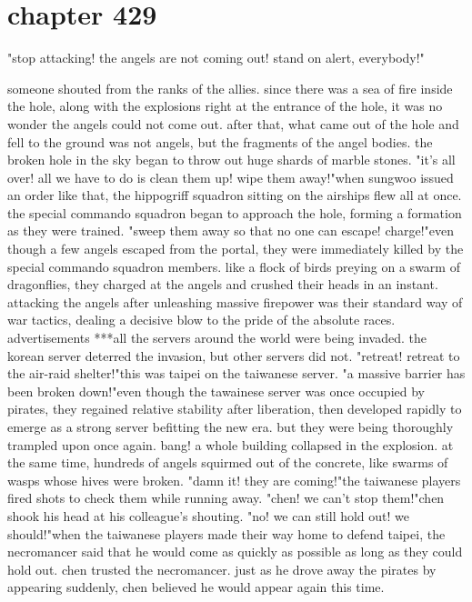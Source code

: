 \section{chapter 429}

"stop attacking! the angels are not coming out! stand on alert, everybody!"




someone shouted from the ranks of the allies.
 since there was a sea of fire inside the hole, along with the explosions right at the entrance of the hole, it was no wonder the angels could not come out.
after that, what came out of the hole and fell to the ground was not angels, but the fragments of the angel bodies.
 the broken hole in the sky began to throw out huge shards of marble stones.
"it's all over! all we have to do is clean them up! wipe them away!"when sungwoo issued an order like that, the hippogriff squadron sitting on the airships flew all at once.
 the special commando squadron began to approach the hole, forming a formation as they were trained.
"sweep them away so that no one can escape! charge!"even though a few angels escaped from the portal, they were immediately killed by the special commando squadron members.
like a flock of birds preying on a swarm of dragonflies, they charged at the angels and crushed their heads in an instant.
attacking the angels after unleashing massive firepower was their standard way of war tactics, dealing a decisive blow to the pride of the absolute races.
advertisements    ***all the servers around the world were being invaded.
 the korean server deterred the invasion, but other servers did not.
 "retreat! retreat to the air-raid shelter!"this was taipei on the taiwanese server.
"a massive barrier has been broken down!"even though the tawainese server was once occupied by pirates, they regained relative stability after liberation, then developed rapidly to emerge as a strong server befitting the new era.
 but they were being thoroughly trampled upon once again.
bang!
a whole building collapsed in the explosion.
 at the same time, hundreds of angels squirmed out of the concrete, like swarms of wasps whose hives were broken.
"damn it! they are coming!"the taiwanese players fired shots to check them while running away.
"chen! we can't stop them!"chen shook his head at his colleague's shouting.
"no! we can still hold out! we should!"when the taiwanese players made their way home to defend taipei, the necromancer said that he would come as quickly as possible as long as they could hold out.
chen trusted the necromancer.
 just as he drove away the pirates by appearing suddenly, chen believed he would appear again this time.
